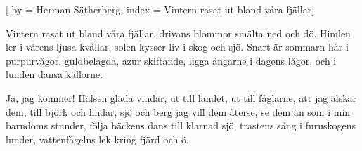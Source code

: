 [
by = {Herman Sätherberg},
index = {Vintern rasat ut bland våra fjällar}]

\beginverse* Vintern rasat ut bland våra fjällar,
drivans blommor smälta ned och dö.
Himlen ler i vårens ljusa kvällar,
solen kysser liv i skog och sjö.
Snart är sommarn här i purpurvågor,
guldbelagda, azur skiftande,
ligga ängarne i dagens lågor,
och i lunden dansa källorne.
\endverse

\beginverse* Ja, jag kommer! Hälsen glada vindar,
ut till landet, ut till fåglarne,
att jag älskar dem, till björk och lindar,
sjö och berg jag vill dem återse,
se dem än som i min barndoms stunder,
följa bäckens dans till klarnad sjö,
trastens sång i furuskogens lunder,
vattenfågelns lek kring fjärd och ö.
\endverse
\endsong


